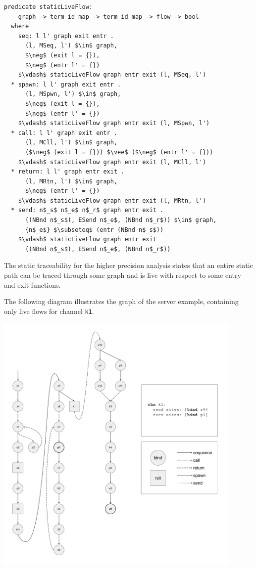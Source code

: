 \documentclass[letterpaper, 11pt]{extarticle}
\begin{document}
\begin{lstlisting}[language=logic, mathescape]
  predicate staticLiveFlow:
    graph -> term_id_map -> term_id_map -> flow -> bool
  where
    seq: l l' graph exit entr . 
      (l, MSeq, l') $\in$ graph,
      $\neg$ (exit l = {}),
      $\neg$ (entr l' = {})
    $\vdash$ staticLiveFlow graph entr exit (l, MSeq, l')
  * spawn: l l' graph exit entr .
      (l, MSpwn, l') $\in$ graph, 
      $\neg$ (exit l = {}),
      $\neg$ (entr l' = {})
    $\vdash$ staticLiveFlow graph entr exit (l, MSpwn, l')
  * call: l l' graph exit entr .
      (l, MCll, l') $\in$ graph,
      ($\neg$ (exit l = {})) $\vee$ ($\neg$ (entr l' = {}))
    $\vdash$ staticLiveFlow graph entr exit (l, MCll, l')
  * return: l l' graph entr exit .
      (l, MRtn, l') $\in$ graph,
      $\neg$ (entr l' = {})
    $\vdash$ staticLiveFlow graph entr exit (l, MRtn, l')
  * send: n$_s$ n$_e$ n$_r$ graph entr exit .
      ((NBnd n$_s$), ESend n$_e$, (NBnd n$_r$)) $\in$ graph, 
      {n$_e$} $\subseteq$ (entr (NBnd n$_s$))
    $\vdash$ staticLiveFlow graph entr exit
      ((NBnd n$_s$), ESend n$_e$, (NBnd n$_r$))
\end{lstlisting}

The static traceability for the higher precision analysis states
that an entire static path can be traced through some graph and
is live with respect to some entry and exit functions.

The following diagram illustrates the graph of the server example,
containing only live flows for channel \lstinline{k1}. \

\includegraphics[width=0.9\textwidth]{cml-graph-k1.pdf}
\end{document}

